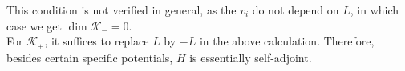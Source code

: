 This condition is not verified in general, as the $v_i$ do not depend on $L$, in which case we get $\dim \mathcal{K}_- = 0$. \\
For $\mathcal{K}_+$, it suffices to replace $L$ by $-L$ in the above calculation. Therefore, besides certain specific potentials, $H$ is essentially self-adjoint.

















